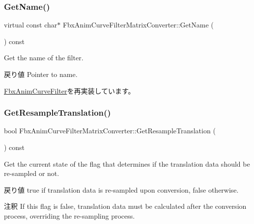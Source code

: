 \subsubsection{\texorpdfstring{Get\+Name()}{GetName()}}
{\footnotesize\ttfamily virtual const char$\ast$ Fbx\+Anim\+Curve\+Filter\+Matrix\+Converter\+::\+Get\+Name (\begin{DoxyParamCaption}{ }\end{DoxyParamCaption}) const\hspace{0.3cm}{\ttfamily [virtual]}}

Get the name of the filter. \begin{DoxyReturn}{戻り値}
Pointer to name. 
\end{DoxyReturn}


\hyperlink{class_fbx_anim_curve_filter_abd559d5052fbb072042e59241940a35c}{Fbx\+Anim\+Curve\+Filter}を再実装しています。

\mbox{\label{class_fbx_anim_curve_filter_matrix_converter_a7603a34315c35f2d9ba8f501059992c5}} 
\subsubsection{\texorpdfstring{Get\+Resample\+Translation()}{GetResampleTranslation()}}
{\footnotesize\ttfamily bool Fbx\+Anim\+Curve\+Filter\+Matrix\+Converter\+::\+Get\+Resample\+Translation (\begin{DoxyParamCaption}{ }\end{DoxyParamCaption}) const}

Get the current state of the flag that determines if the translation data should be re-\/sampled or not. \begin{DoxyReturn}{戻り値}
{\ttfamily true} if translation data is re-\/sampled upon conversion, {\ttfamily false} otherwise. 
\end{DoxyReturn}
\begin{DoxyRemark}{注釈}
If this flag is {\ttfamily false}, translation data must be calculated after the conversion process, overriding the re-\/sampling process. 
\end{DoxyRemark}
\mbox{\label{class_fbx_anim_curve_filter_matrix_converter_a6f5d905229e996ddccfe96e2cd4454e3}} 
